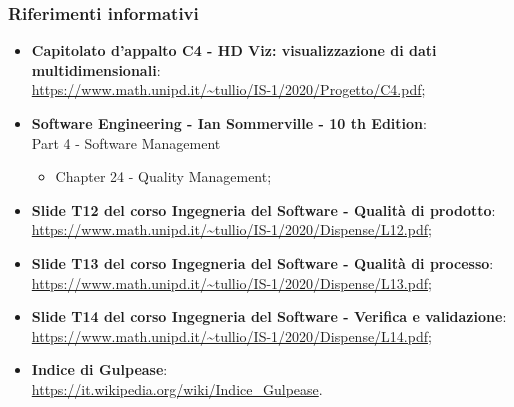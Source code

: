 \subsubsection{Riferimenti informativi}
\begin{itemize}
\item \textbf{Capitolato d'appalto C4 - HD Viz: visualizzazione di dati multidimensionali}:\\
	\textcolor{blue}{\url{https://www.math.unipd.it/~tullio/IS-1/2020/Progetto/C4.pdf}};
	
	
	\item \textbf{Software Engineering - Ian Sommerville - 10 th Edition}: \\
	Part 4 - Software Management
	\begin{itemize}
	\item Chapter 24 - Quality Management;
	\end{itemize}
	
	\item \textbf{Slide T12 del corso Ingegneria del Software - Qualità di prodotto}:\\
	\textcolor{blue}{\url{https://www.math.unipd.it/~tullio/IS-1/2020/Dispense/L12.pdf}};
	\item \textbf{Slide T13 del corso Ingegneria del Software - Qualità di processo}:\\
	\textcolor{blue}{\url{https://www.math.unipd.it/~tullio/IS-1/2020/Dispense/L13.pdf}};
	\item \textbf{Slide T14 del corso Ingegneria del Software - Verifica e validazione}:\\
	\textcolor{blue}{\url{https://www.math.unipd.it/~tullio/IS-1/2020/Dispense/L14.pdf}};
	
	\item \textbf{Indice di Gulpease}:\\
	\textcolor{blue}{\url{https://it.wikipedia.org/wiki/Indice_Gulpease}}.
	
\end{itemize}
